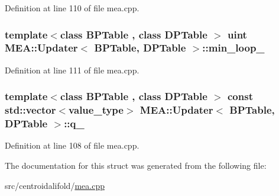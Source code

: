 Definition at line 110 of file mea.\+cpp.

\hypertarget{struct_m_e_a_1_1_updater_a8831f08c5d04f9fd05d1d9dd284af641}{
\subsubsection[{min\+\_\+loop\+\_\+}]{\setlength{\rightskip}{0pt plus 5cm}template$<$class B\+P\+Table , class D\+P\+Table $>$ {\bf uint} {\bf M\+E\+A\+::\+Updater}$<$ {\bf B\+P\+Table}, D\+P\+Table $>$\+::min\+\_\+loop\+\_\+}}\label{struct_m_e_a_1_1_updater_a8831f08c5d04f9fd05d1d9dd284af641}


Definition at line 111 of file mea.\+cpp.

\hypertarget{struct_m_e_a_1_1_updater_a06a1f82c408b0c63fb2e56f1fffa4cea}{
\subsubsection[{q\+\_\+}]{\setlength{\rightskip}{0pt plus 5cm}template$<$class B\+P\+Table , class D\+P\+Table $>$ const std\+::vector$<${\bf value\+\_\+type}$>$ {\bf M\+E\+A\+::\+Updater}$<$ {\bf B\+P\+Table}, D\+P\+Table $>$\+::q\+\_\+}}\label{struct_m_e_a_1_1_updater_a06a1f82c408b0c63fb2e56f1fffa4cea}


Definition at line 108 of file mea.\+cpp.



The documentation for this struct was generated from the following file\+:\begin{DoxyCompactItemize}
\item 
src/centroidalifold/\hyperlink{mea_8cpp}{mea.\+cpp}\end{DoxyCompactItemize}
